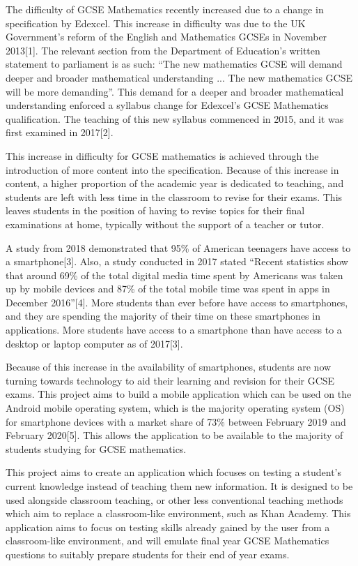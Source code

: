 \documentclass{article}
\begin{document}
The difficulty of GCSE Mathematics recently increased due to a change in specification by Edexcel. This increase in difficulty was due to the UK Government's reform of the English and Mathematics GCSEs in November 2013[1]. The relevant section from the Department of Education's written statement to parliament is as such: ``The new mathematics GCSE will demand deeper and broader mathematical understanding ...  The new mathematics GCSE will be more demanding''. This demand for a deeper and broader mathematical understanding enforced a syllabus change for Edexcel's GCSE Mathematics qualification. The teaching of this new syllabus commenced in 2015, and it was first examined in 2017[2]. \par

This increase in difficulty for GCSE mathematics is achieved through the introduction of more content into the specification. Because of this increase in content, a higher proportion of the academic year is dedicated to teaching, and students are left with less time in the classroom to revise for their exams. This leaves students in the position of having to revise topics for their final examinations at home, typically without the support of a teacher or tutor. \par

A study from 2018 demonstrated that 95\% of American teenagers have access to a smartphone[3]. Also, a study conducted in 2017 stated ``Recent statistics show that around 69\% of the total digital media time spent by Americans was taken up by mobile devices and 87\% of the total mobile time was spent in apps in December 2016''[4]. More students than ever before have access to smartphones, and they are spending the majority of their time on these smartphones in applications. More students have access to a smartphone than have access to a desktop or laptop computer as of 2017[3]. \par

Because of this increase in the availability of smartphones, students are now turning towards technology to aid their learning and revision for their GCSE exams. This project aims to build a mobile application which can be used on the Android mobile operating system, which is the majority operating system (OS) for smartphone devices with a market share of 73\% between February 2019 and February 2020[5]. This allows the application to be available to the majority of students studying for GCSE mathematics. \par

This project aims to create an application which focuses on testing a student's current knowledge instead of teaching them new information. It is designed to be used alongside classroom teaching, or other less conventional teaching methods which aim to replace a classroom-like environment, such as Khan Academy. This application aims to focus on testing skills already gained by the user from a classroom-like environment, and will emulate final year GCSE Mathematics questions to suitably prepare students for their end of year exams. \par
\end{document}
